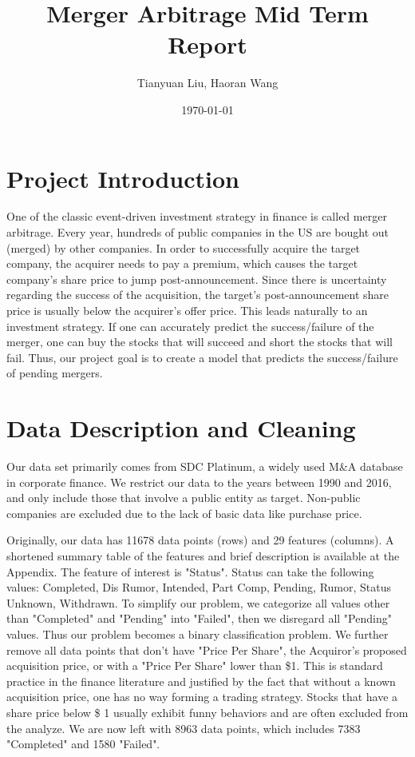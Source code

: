 \documentclass[a4paper]{article}
\title{Merger Arbitrage Mid Term Report}
\author{Tianyuan Liu, Haoran Wang}
\date{\today}
\begin{document}
\maketitle

\section{Project Introduction}
\label{sec:idea}

One of the classic event-driven investment strategy in finance is called merger arbitrage. Every year, hundreds of public companies in the US are bought out (merged) by other companies. In order to successfully acquire the target company, the acquirer needs to pay a premium, which causes the target company’s share price to jump post-announcement. Since there is uncertainty regarding the success of the acquisition, the target’s post-announcement share price is usually below the acquirer’s offer price. This leads naturally to an investment strategy. If one can accurately predict the success/failure of the merger, one can buy the stocks that will succeed and short the stocks that will fail. Thus, our project goal is to create a model that predicts the success/failure of pending mergers.

\section{Data Description and Cleaning }
\label{sec:data}

Our data set primarily comes from SDC Platinum, a widely used M\&A database in corporate finance. We restrict our data to the years between 1990 and 2016, and only include those that involve a public entity as target. Non-public companies are excluded due to the lack of basic data like purchase price.

Originally, our data has 11678 data points (rows) and 29 features (columns). A shortened summary table of the features and brief description is available at the Appendix. The feature of interest is "Status". Status can take the following values: Completed, Dis Rumor, Intended, Part Comp, Pending, Rumor, Status Unknown, Withdrawn. To simplify our problem, we categorize all values other than "Completed" and "Pending" into "Failed", then we disregard all "Pending" values. Thus our problem becomes a binary classification problem. We further remove all data points that don't have "Price Per Share", the Acquiror's proposed acquisition price, or with a "Price Per Share" lower than \$1. This is standard practice in the finance literature and justified by the fact that without a known acquisition price, one has no way forming a trading strategy. Stocks that have a share price below \$ 1 usually exhibit funny behaviors and are often excluded from the analyze. We are now left with 8963 data points, which includes 7383 "Completed" and 1580 "Failed".
\end{document}
